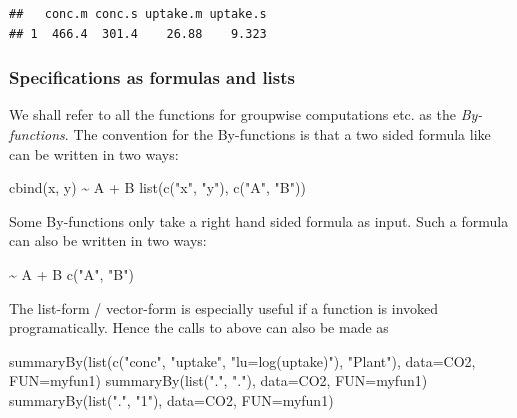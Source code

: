 \documentclass[
]{article}
\newenvironment{Shaded}{\begin{snugshade}}{\end{snugshade}}
\newcommand{\AttributeTok}[1]{\textcolor[rgb]{0.77,0.63,0.00}{#1}}
\newcommand{\FunctionTok}[1]{\textcolor[rgb]{0.00,0.00,0.00}{#1}}
\newcommand{\NormalTok}[1]{#1}
\newcommand{\SpecialCharTok}[1]{\textcolor[rgb]{0.00,0.00,0.00}{#1}}
\newcommand{\StringTok}[1]{\textcolor[rgb]{0.31,0.60,0.02}{#1}}
\begin{document}
\begin{verbatim}
##   conc.m conc.s uptake.m uptake.s
## 1  466.4  301.4    26.88    9.323
\end{verbatim}

\hypertarget{specifications-as-formulas-and-lists}{%
\subsubsection{Specifications as formulas and
lists}\label{specifications-as-formulas-and-lists}}

We shall refer to all the functions for groupwise computations etc. as
the \emph{By-functions}. The convention for the By-functions is that a
two sided formula like can be written in two ways:

\begin{Shaded}
\begin{Highlighting}[]
\FunctionTok{cbind}\NormalTok{(x, y) }\SpecialCharTok{\textasciitilde{}}\NormalTok{ A }\SpecialCharTok{+}\NormalTok{ B}
\FunctionTok{list}\NormalTok{(}\FunctionTok{c}\NormalTok{(}\StringTok{"x"}\NormalTok{, }\StringTok{"y"}\NormalTok{), }\FunctionTok{c}\NormalTok{(}\StringTok{"A"}\NormalTok{, }\StringTok{"B"}\NormalTok{))}
\end{Highlighting}
\end{Shaded}

Some By-functions only take a right hand sided formula as input. Such a
formula can also be written in two ways:

\begin{Shaded}
\begin{Highlighting}[]
\SpecialCharTok{\textasciitilde{}}\NormalTok{ A }\SpecialCharTok{+}\NormalTok{ B}
\FunctionTok{c}\NormalTok{(}\StringTok{"A"}\NormalTok{, }\StringTok{"B"}\NormalTok{)}
\end{Highlighting}
\end{Shaded}

The list-form / vector-form is especially useful if a function is
invoked programatically. Hence the calls to  above can
also be made as

\begin{Shaded}
\begin{Highlighting}[]
\FunctionTok{summaryBy}\NormalTok{(}\FunctionTok{list}\NormalTok{(}\FunctionTok{c}\NormalTok{(}\StringTok{"conc"}\NormalTok{, }\StringTok{"uptake"}\NormalTok{, }\StringTok{"lu=log(uptake)"}\NormalTok{), }\StringTok{"Plant"}\NormalTok{), }\AttributeTok{data=}\NormalTok{CO2, }\AttributeTok{FUN=}\NormalTok{myfun1)}
\FunctionTok{summaryBy}\NormalTok{(}\FunctionTok{list}\NormalTok{(}\StringTok{"."}\NormalTok{, }\StringTok{"."}\NormalTok{), }\AttributeTok{data=}\NormalTok{CO2, }\AttributeTok{FUN=}\NormalTok{myfun1)}
\FunctionTok{summaryBy}\NormalTok{(}\FunctionTok{list}\NormalTok{(}\StringTok{"."}\NormalTok{, }\StringTok{"1"}\NormalTok{), }\AttributeTok{data=}\NormalTok{CO2, }\AttributeTok{FUN=}\NormalTok{myfun1)}
\end{Highlighting}
\end{Shaded}
\end{document}
